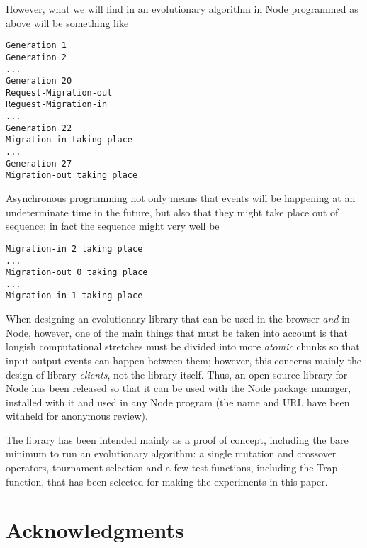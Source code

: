 \documentclass{sig-alternate}
\begin{document}
However, what we will find in an evolutionary algorithm in Node
programmed as above will be something like
\begin{lstlisting}
Generation 1
Generation 2
...
Generation 20
Request-Migration-out
Reguest-Migration-in
...
Generation 22
Migration-in taking place
...
Generation 27
Migration-out taking place
\end{lstlisting}
Asynchronous programming not only means that events will be happening
at an undeterminate time in the future, but also that they might take
place out of sequence; in fact the sequence might very well be
\begin{lstlisting}
Migration-in 2 taking place
...
Migration-out 0 taking place
...
Migration-in 1 taking place
\end{lstlisting}

When designing an evolutionary library that can be used in the browser
{\em and} in Node, however, one of the main things that must be taken
into account is that longish computational stretches must be divided
into more {\em atomic} chunks so that input-output events can happen
between them; however, this concerns mainly the design of library {\em
  clients}, not the library itself. Thus, an open source library for
Node has been released  so that it can be used with the Node package
manager, installed with it and used in any Node program (the name and
URL have been withheld for anonymous review).

The library has been intended mainly as a proof of concept, including
the bare minimum to run an evolutionary algorithm: a single mutation
and crossover operators, tournament selection and a few test
functions, including the Trap function, that has been selected for
making the experiments in this paper. 




\section{Acknowledgments}


%

\end{document}
